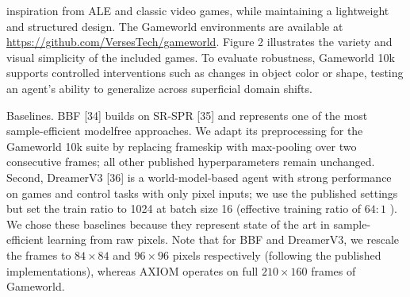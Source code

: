 \documentclass[10pt]{article}
\begin{document}
inspiration from ALE and classic video games, while maintaining a lightweight and structured design. The Gameworld environments are available at \href{https://github.com/VersesTech/gameworld}{https://github.com/VersesTech/gameworld}. Figure 2 illustrates the variety and visual simplicity of the included games. To evaluate robustness, Gameworld 10k supports controlled interventions such as changes in object color or shape, testing an agent's ability to generalize across superficial domain shifts.

Baselines. BBF [34] builds on SR-SPR [35] and represents one of the most sample-efficient modelfree approaches. We adapt its preprocessing for the Gameworld 10k suite by replacing frameskip with max-pooling over two consecutive frames; all other published hyperparameters remain unchanged. Second, DreamerV3 [36] is a world-model-based agent with strong performance on games and control tasks with only pixel inputs; we use the published settings but set the train ratio to 1024 at batch size 16 (effective training ratio of $64: 1$ ). We chose these baselines because they represent state of the art in sample-efficient learning from raw pixels. Note that for BBF and DreamerV3, we rescale the frames to $84 \times 84$ and $96 \times 96$ pixels respectively (following the published implementations), whereas AXIOM operates on full $210 \times 160$ frames of Gameworld.
\end{document}
